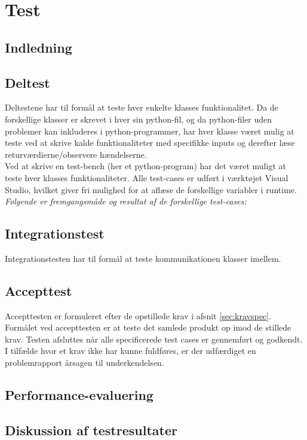 \documentclass[rapport.tex]{subfiles}
\begin{document}
\section{Test}
	\subsection{Indledning}
	\subsection{Deltest}
	Deltestene har til formål at teste hver enkelte klasses funktionalitet. 
	Da de forskellige klasser er skrevet i hver sin python-fil, og da python-filer uden problemer kan inkluderes i python-programmer, har hver klasse været mulig at teste ved at skrive kalde funktionaliteter med specifikke inputs og derefter læse returværdierne/observere hændelserne. \\
	
	Ved at skrive en test-bench (her et python-program) har det været muligt at teste hver klasses funktionaliteter. Alle test-cases er udført i værktøjet Visual Studio, hvilket giver fri mulighed for at aflæse de forskellige variabler i runtime. \textit{Følgende er fremgangsmåde og resultat af de forskellige test-cases:}
	\subsection{Integrationstest}
	Integrationstesten har til formål at teste kommunikationen klasser imellem. 
	\subsection{Accepttest}
	Accepttesten er formuleret efter de opstillede krav i afsnit \ref{sec:kravspec}. Formålet ved accepttesten er at teste det samlede produkt op imod de stillede krav. Testen afsluttes når alle specificerede test cases er gennemført og godkendt. I tilfælde hvor et krav ikke har kunne fuldføres, er der udfærdiget en problemrapport årsagen til underkendelsen. 
	
	\subsection{Performance-evaluering}
	\subsection{Diskussion af testresultater}
		
\end{document}

